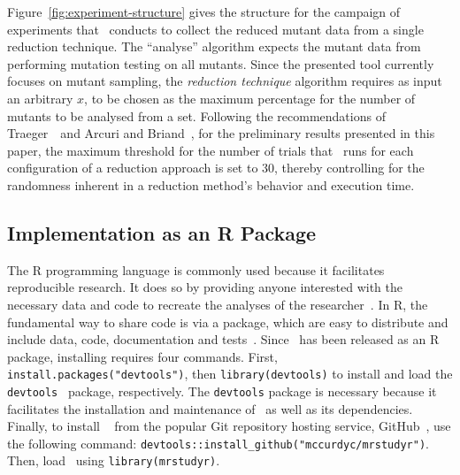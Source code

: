 
Figure~\ref{fig:experiment-structure} gives the structure for the campaign of experiments that \mr~conducts to collect
the reduced mutant data from a single reduction technique. The ``analyse'' algorithm expects the mutant data from
performing mutation testing on all mutants. Since the presented tool currently focuses on mutant sampling, the
\textit{reduction technique} algorithm requires as input an arbitrary $x$, to be chosen as the maximum percentage for
the number of mutants to be analysed from a set. Following the recommendations of Traeger~\etal~and Arcuri and
Briand~\cite{traeger2008nine, arcuri2014hitchhiker}, for the preliminary results presented in this paper, the maximum
threshold for the number of trials that \mr~runs for each configuration of a reduction approach is set to 30, thereby
controlling for the randomness inherent in a reduction method's behavior and execution time.

\subsection{Implementation as an R Package}


The R programming language is commonly used because it facilitates reproducible research. It does so by providing anyone
interested with the necessary data and code to recreate the analyses of the researcher~\cite{gentleman2012statistical}.
In R, the fundamental way to share code is via a package, which are easy to distribute and include data, code,
documentation and tests~\cite{wickham2015r}.  Since \mr~has been released as an R package, installing requires four
commands.  First, \texttt{install.packages("devtools")}, then {\small\texttt{library(devtools)}} to install and load the
{\small\texttt{devtools}}~\cite{devtools} package, respectively.  The \texttt{devtools} package is necessary because it
facilitates the installation and maintenance of \mr~as well as its dependencies.  Finally, to install \mr~\cite{tool}
from the popular Git repository hosting service, GitHub~\cite{github}, use the following command:
{\small\texttt{devtools::install\_github("mccurdyc/mrstudyr")}}.  Then, load \mr~using \texttt{library(mrstudyr)}.



